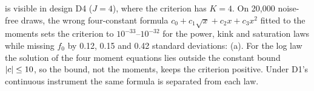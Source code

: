  is visible in design D4 ($J = 4$), where the criterion has $K = 4$. On 20{,}000 noise-free draws, the wrong four-constant formula $c_0 + c_1\sqrt x + c_2x + c_3x^2$ fitted to the moments sets the criterion to $10^{-33}$--$10^{-32}$ for the power, kink and saturation laws while missing $f_0$ by 0.12, 0.15 and 0.42 standard deviations: (a). For the log law the solution of the four moment equations lies outside the constant bound $\lvert c\rvert \le 10$, so the bound, not the moments, keeps the criterion positive. Under D1's continuous instrument the same formula is separated from each law.
